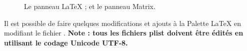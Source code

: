 \documentclass[11pt,french]{article}
\newcommand{\cmd}[1]{\textsf{#1}}
\newcommand{\mnu}[1]{\textsf{#1}}
\begin{document}
\begin{figure}
{}%
\qquad%
%
\caption[Les panneaux LaTeX et Matrix.]{
 Le panneau LaTeX ; et
 le panneau Matrix.}
\label{LandMPanels}
\end{figure}

Il est possible de faire quelques modifications et ajouts à la \mnu{Palette LaTeX} en modifiant le fichier . \textbf{Note : tous les fichiers \cmd{plist} doivent être édités en utilisant le codage Unicode UTF-8.}

\end{document}
